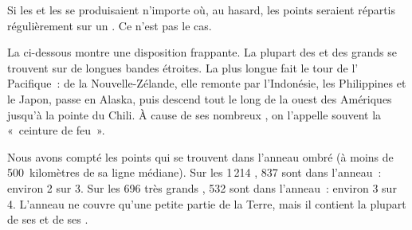 Si les  et les  se produisaient n'importe où, au hasard, les
points seraient répartis régulièrement sur un . Ce n'est pas le
cas.

La  ci-dessous montre une disposition frappante. La plupart des
 et des grands  se trouvent sur de longues bandes étroites.
La plus longue fait le tour de l' Pacifique~: de la Nouvelle-Zélande,
elle remonte par l'Indonésie, les Philippines et le Japon, passe en Alaska,
puis descend tout le long de la  ouest des Amériques jusqu'à la pointe
du Chili. À cause de ses nombreux , on l'appelle souvent la
«~ceinture de feu~».

\begin{example}\label{ex:g4:volcanoes-earthquakes-first-look:shares}
Nous avons compté les points qui se trouvent dans l'anneau ombré (à moins
de 500~kilomètres de sa ligne médiane). Sur les 1\,214 , 837 sont
dans l'anneau~: environ 2 sur 3. Sur les 696 très grands , 532 sont
dans l'anneau~: environ 3 sur 4. L'anneau ne couvre qu'une petite partie
de la Terre, mais il contient la plupart de ses  et de ses .
\end{example}

